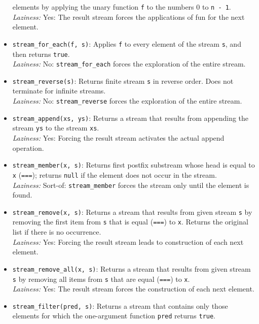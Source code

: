 \begin{itemize}
elements by applying the unary function \lstinline{f} to the numbers 0
to \lstinline{n - 1}.\\
\emph{Laziness:}  Yes: The result stream forces the applications of fun
            for the next element.
\item \lstinline{stream_for_each(f, s)}: Applies \lstinline{f} to every
  element of the stream \lstinline{s}, and then returns
  \lstinline{true}.\\
\emph{Laziness:}  No: \lstinline{stream_for_each} forces the exploration of the entire stream.
\item \lstinline{stream_reverse(s)}: Returns finite stream \lstinline{s} in reverse
  order. Does not terminate for infinite streams.\\
\emph{Laziness:}  No: \lstinline{stream_reverse} forces the exploration of the entire stream.
\item \lstinline{stream_append(xs, ys)}: Returns a stream that results from 
appending the stream \lstinline{ys} to the stream \lstinline{xs}.\\
\emph{Laziness:}  Yes: Forcing the result stream activates the actual append operation.
\item \lstinline{stream_member(x, s)}: Returns first postfix substream
whose head is equal to
\lstinline{x} (\lstinline{===}); returns \lstinline{null} if the
element does not occur in the stream.\\
 \emph{Laziness:}  Sort-of: \lstinline{stream_member} forces the stream only until the element is found.
\item \lstinline{stream_remove(x, s)}: Returns a stream that results from
given stream \lstinline{s} by removing the first item from \lstinline{s} that
is equal (\lstinline{===}) to \lstinline{x}.
Returns the original list
if there is no occurrence.\\
\emph{Laziness:}  Yes: Forcing the result stream leads to construction of each next element.
\item \lstinline{stream_remove_all(x, s)}: Returns a stream that results from
given stream \lstinline{s} by removing all items from \lstinline{s} that
are equal (\lstinline{===}) to \lstinline{x}.\\
\emph{Laziness:}  Yes: The result stream forces the construction of each next element.
\item \lstinline{stream_filter(pred, s)}: Returns a stream that contains
only those elements for which the one-argument function
\lstinline{pred}
returns \lstinline{true}.\\

\end{itemize}
